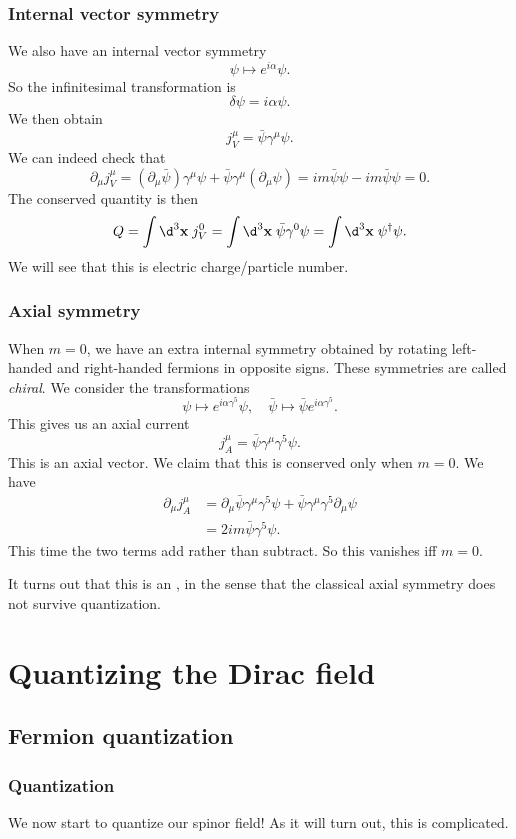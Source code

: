 \documentclass[a4paper]{article}
\begin{document}
\subsubsection*{Internal vector symmetry}
We also have an internal vector symmetry
\[
  \psi \mapsto e^{i\alpha} \psi.
\]
So the infinitesimal transformation is
\[
  \delta \psi = i \alpha \psi.
\]
We then obtain
\[
  j_V^\mu = \bar\psi \gamma^\mu \psi.
\]
We can indeed check that
\[
  \partial_\mu j_V^\mu = (\partial_\mu \bar\psi) \gamma^\mu \psi + \bar\psi \gamma^\mu (\partial_\mu \psi) = im \bar\psi \psi - im \bar\psi \psi = 0.
\]
The conserved quantity is then
\[
  Q = \int \d^3 \mathbf{x}\; j_V^0 = \int \d^3 \mathbf{x}\; \bar\psi \gamma^0 \psi = \int \d^3 \mathbf{x}\; \psi^\dagger \psi.
\]
We will see that this is electric charge/particle number.

\subsubsection*{Axial symmetry}
When $m = 0$, we have an extra internal symmetry obtained by rotating left-handed and right-handed fermions in opposite signs. These symmetries are called \emph{chiral}. We consider the transformations
\[
  \psi \mapsto e^{i \alpha \gamma^5} \psi,\quad \bar\psi \mapsto \bar\psi e^{i\alpha \gamma^5}.
\]
This gives us an axial current
\[
  j_A^\mu = \bar\psi \gamma^\mu \gamma^5 \psi.
\]
This is an axial vector. We claim that this is conserved only when $m = 0$. We have
\begin{align*}
  \partial_\mu j_A^\mu &= \partial_\mu \bar\psi \gamma^\mu \gamma^5 \psi + \bar\psi \gamma^\mu \gamma^5 \partial_\mu \psi\\
  &= 2im \bar\psi\gamma^5 \psi.
\end{align*}
This time the two terms add rather than subtract. So this vanishes iff $m = 0$.

It turns out that this is an , in the sense that the classical axial symmetry does not survive quantization.

\section{Quantizing the Dirac field}
\subsection{Fermion quantization}
\subsubsection*{Quantization}
We now start to quantize our spinor field! As it will turn out, this is complicated.
\end{document}
